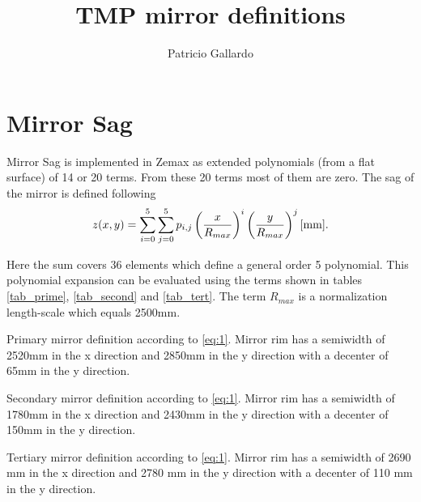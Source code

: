 \documentclass[12pt, letterpaper, twoside]{article}
\title{TMP mirror definitions}
\author{Patricio Gallardo}
\begin{document}
\maketitle


\section{Mirror Sag}

Mirror Sag is implemented in Zemax as extended polynomials (from a flat surface) of 14 or 20 terms. From these 20 terms most of them are zero. The sag of the mirror is defined following 
\begin{equation}
\label{eq:1}
z(x,y) = \sum_{i=0}^5 \sum_{j=0}^{5} p_{i,j} \left( \frac{x}{R_{max}}\right )^i \left(\frac{y}{R_{max}}\right)^j [\rm{mm}]. 
\end{equation}

Here the sum covers 36 elements which define a general order 5 polynomial. This polynomial expansion can be evaluated using the terms shown in tables \ref{tab_prime}, \ref{tab_second} and \ref{tab_tert}. The term $R_{max}$ is a normalization length-scale which equals 2500mm.

\begin{table}
	
	\caption{Primary mirror definition according to \ref{eq:1}. Mirror rim has a semiwidth of 2520mm in the x direction and 2850mm in the y direction with a decenter of 65mm in the y direction.}
		\label{tab_prime}
\end{table}

\begin{table}

	
	\caption{Secondary mirror definition according to \ref{eq:1}. Mirror rim has a semiwidth of 1780mm in the x direction and 2430mm in the y direction with a decenter of 150mm in the y direction.}
	\label{tab_second}
\end{table}

\begin{table}
	
	\caption{Tertiary mirror definition according to \ref{eq:1}. Mirror rim has a semiwidth of 2690 mm in the x direction and 2780 mm in the y direction with a decenter of 110 mm in the y direction.}
	\label{tab_tert}
\end{table}
\end{document}
